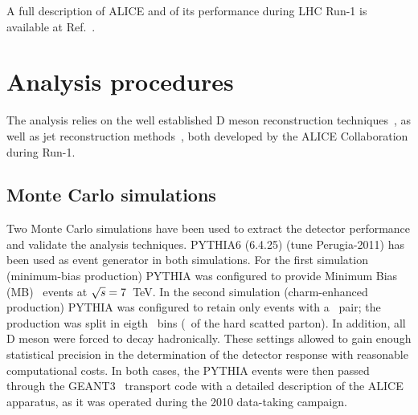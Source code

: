 \documentclass[a4paper]{jpconf}
\begin{document}
A full description of ALICE and of its performance during LHC Run-1 is available at Ref.~\cite{ALICE:2014b}.

\section{Analysis procedures}
The analysis relies on the well established D meson reconstruction techniques~\cite{ALICE:2012d, ALICE:2016a}, as well as
jet reconstruction methods~\cite{ALICE:2013c, ALICE:2015a, ALICE:2015e}, both developed by the ALICE Collaboration during Run-1.

\subsection{Monte Carlo simulations}
Two Monte Carlo simulations have been used to extract the detector performance and validate the analysis techniques.
PYTHIA6 (6.4.25)\cite{Sjostrand:2006} (tune Perugia-2011) has been used as event generator in both simulations.
For the first simulation (minimum-bias production) PYTHIA was configured to provide Minimum Bias (MB) \pp\ events at $\sqrt{s}=7$~TeV.
In the second simulation (charm-enhanced production) PYTHIA was configured to retain only events with a \ccbar\ pair; the production
was split in eigth \pthard\ bins (\pT\ of the hard scatted parton). In addition, all D meson were forced
to decay hadronically. These settings allowed to gain enough statistical precision in the determination of the detector response with reasonable
computational costs.
In both cases, the PYTHIA events were then passed through the GEANT3~\cite{GEANT3-url} transport code with a detailed description of the ALICE apparatus,
as it was operated during the 2010 data-taking campaign.
\end{document}
